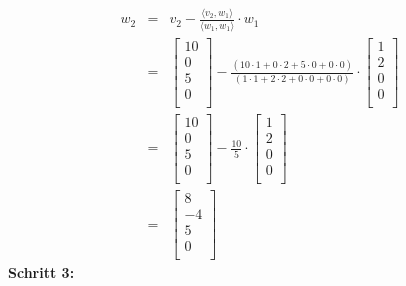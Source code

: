 \documentclass{report}
\begin{document}
			\begin{eqnarray*} w_2 &=& v_2 - \frac{\langle v_2, w_1 \rangle}{\langle w_1, w_1 \rangle} \cdot w_1 \\
				&=& \begin{bmatrix} 10 \\ 0 \\ 5 \\ 0 \\ \end{bmatrix} - \frac{(10 \cdot 1 + 0 \cdot 2 + 5 \cdot 0 + 0 \cdot 0)}
				{(1 \cdot 1 + 2 \cdot 2 + 0 \cdot 0 + 0 \cdot 0)} \cdot \begin{bmatrix} 1 \\ 2 \\ 0 \\ 0 \\ \end{bmatrix} \\
				&=& \begin{bmatrix} 10 \\ 0 \\ 5 \\ 0 \\ \end{bmatrix} - 
				\frac{10}{5} \cdot \begin{bmatrix} 1 \\ 2 \\ 0 \\ 0 \\ \end{bmatrix} \\
				&=& \begin{bmatrix} 8 \\ -4 \\ 5 \\ 0 \\ \end{bmatrix}
			\end{eqnarray*}
			\textbf{Schritt 3:}\\
\end{document}
